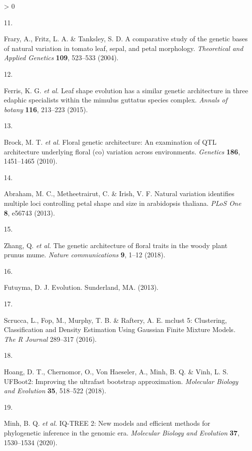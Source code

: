 \documentclass[
  11pt,
]{article}
\newlength{\cslhangindent}
\newlength{\csllabelwidth}
\newenvironment{CSLReferences}[2] %
 {%
  \setlength{\parindent}{0pt}
  \ifodd #1 \everypar{\setlength{\hangindent}{\cslhangindent}}\ignorespaces\fi
  \ifnum #2 > 0
  \setlength{\parskip}{#2\baselineskip}
  \fi
 }%
 {}
\newcommand{\CSLLeftMargin}[1]{\parbox[t]{\csllabelwidth}{#1}}
\newcommand{\CSLRightInline}[1]{\parbox[t]{\linewidth - \csllabelwidth}{#1}\break}
\begin{document}
\begin{CSLReferences}{0}{0}
\leavevmode\hypertarget{ref-frary2004comparative}{}%
\CSLLeftMargin{11. }
\CSLRightInline{Frary, A., Fritz, L. A. \& Tanksley, S. D. A comparative study of the genetic bases of natural variation in tomato leaf, sepal, and petal morphology. \emph{Theoretical and Applied Genetics} \textbf{109}, 523--533 (2004).}

\leavevmode\hypertarget{ref-ferris2015leaf}{}%
\CSLLeftMargin{12. }
\CSLRightInline{Ferris, K. G. \emph{et al.} Leaf shape evolution has a similar genetic architecture in three edaphic specialists within the mimulus guttatus species complex. \emph{Annals of botany} \textbf{116}, 213--223 (2015).}

\leavevmode\hypertarget{ref-brock2010floral}{}%
\CSLLeftMargin{13. }
\CSLRightInline{Brock, M. T. \emph{et al.} Floral genetic architecture: An examination of QTL architecture underlying floral (co) variation across environments. \emph{Genetics} \textbf{186}, 1451--1465 (2010).}

\leavevmode\hypertarget{ref-abraham2013natural}{}%
\CSLLeftMargin{14. }
\CSLRightInline{Abraham, M. C., Metheetrairut, C. \& Irish, V. F. Natural variation identifies multiple loci controlling petal shape and size in arabidopsis thaliana. \emph{PLoS One} \textbf{8}, e56743 (2013).}

\leavevmode\hypertarget{ref-zhang2018genetic}{}%
\CSLLeftMargin{15. }
\CSLRightInline{Zhang, Q. \emph{et al.} The genetic architecture of floral traits in the woody plant prunus mume. \emph{Nature communications} \textbf{9}, 1--12 (2018).}

\leavevmode\hypertarget{ref-futuyma2013evolution}{}%
\CSLLeftMargin{16. }
\CSLRightInline{Futuyma, D. J. Evolution. Sunderland, MA. (2013).}

\leavevmode\hypertarget{ref-Scrucca:2016wq}{}%
\CSLLeftMargin{17. }
\CSLRightInline{Scrucca, L., Fop, M., Murphy, T. B. \& Raftery, A. E. {mclust 5: Clustering, Classification and Density Estimation Using Gaussian Finite Mixture Models}. \emph{The R Journal} 289--317 (2016).}

\leavevmode\hypertarget{ref-hoang2018ufboot2}{}%
\CSLLeftMargin{18. }
\CSLRightInline{Hoang, D. T., Chernomor, O., Von Haeseler, A., Minh, B. Q. \& Vinh, L. S. UFBoot2: Improving the ultrafast bootstrap approximation. \emph{Molecular Biology and Evolution} \textbf{35}, 518--522 (2018).}

\leavevmode\hypertarget{ref-minh2020iq}{}%
\CSLLeftMargin{19. }
\CSLRightInline{Minh, B. Q. \emph{et al.} IQ-TREE 2: New models and efficient methods for phylogenetic inference in the genomic era. \emph{Molecular Biology and Evolution} \textbf{37}, 1530--1534 (2020).}


\end{CSLReferences}
\end{document}
